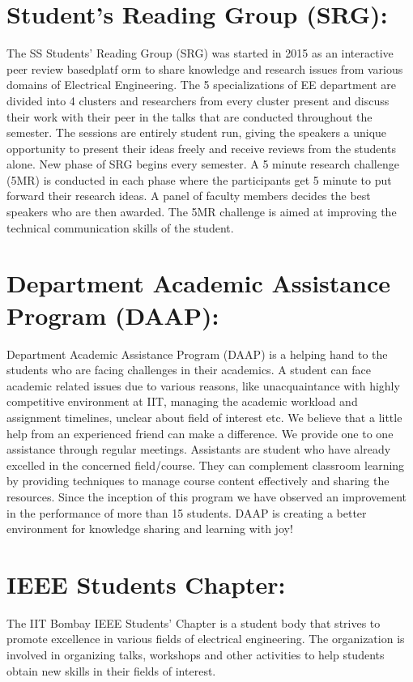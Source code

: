 \documentclass[11pt,openany]{book} %
\begin{document}
\section {Student's Reading Group (SRG):}
The SS Students’ Reading Group (SRG) was started in 2015 as an interactive peer review basedplatf orm to share knowledge and research issues from various domains of Electrical Engineering. The 5 specializations of EE department are divided into 4 clusters and researchers from every cluster present and discuss their work with their peer in the talks that are conducted throughout the semester. The sessions are entirely student run, giving the speakers a unique opportunity to present their ideas freely and receive reviews from the students alone.\newline
New phase of SRG begins every semester. A 5 minute research challenge (5MR) is conducted in each phase where the participants get 5 minute to put forward their research ideas. A panel of faculty members decides the best speakers who are then awarded. The 5MR challenge is aimed
at improving the technical communication skills of the student.
\section {Department Academic Assistance Program (DAAP):}
Department Academic Assistance Program (DAAP) is a helping hand to the students who are facing challenges in their academics. A student can face academic related issues due to various reasons, like unacquaintance with highly competitive environment at IIT, managing the academic
workload and assignment timelines, unclear about field of interest etc. We believe that a little help from an experienced friend can make a difference. We provide one to one assistance through regular meetings. Assistants are student who have already excelled in the concerned field/course. They can complement classroom learning by providing techniques to manage course content effectively and sharing the resources. Since the inception of this program we have observed an improvement in the performance of more than 15 students. DAAP is creating a better environment for knowledge sharing and learning with joy!
\newline
\section {IEEE Students Chapter:}
The IIT Bombay IEEE Students’ Chapter is a student body that strives to promote excellence in various fields of electrical engineering. The organization is involved in organizing talks, workshops and other activities to help students obtain new skills in their fields of interest.\newline
\end{document}
